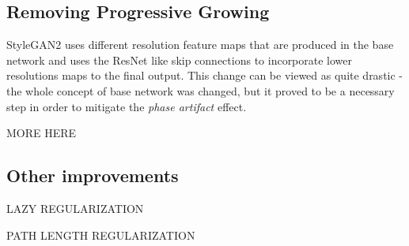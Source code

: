 \documentclass[12pt,a4paper,openany]{book}
\begin{document}
\subsection{Removing Progressive Growing}

StyleGAN2 uses different resolution feature maps that are produced in the base network and uses the ResNet like skip connections to incorporate lower resolutions maps to the final output. This change can be viewed as quite drastic - the whole concept of base network was changed, but it proved to be a necessary step in order to mitigate the \textit{phase artifact} effect.


MORE HERE







\subsection{Other improvements}

LAZY REGULARIZATION

PATH LENGTH REGULARIZATION


\end{document}
